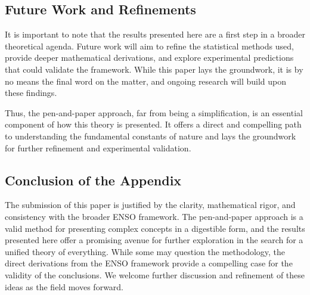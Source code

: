 \documentclass[12pt]{article}
\begin{document}
\subsection{Future Work and Refinements}
It is important to note that the results presented here are a first step in a broader theoretical agenda. Future work will aim to refine the statistical methods used, provide deeper mathematical derivations, and explore experimental predictions that could validate the framework. While this paper lays the groundwork, it is by no means the final word on the matter, and ongoing research will build upon these findings.

Thus, the pen-and-paper approach, far from being a simplification, is an essential component of how this theory is presented. It offers a direct and compelling path to understanding the fundamental constants of nature and lays the groundwork for further refinement and experimental validation.

\subsection{Conclusion of the Appendix}
The submission of this paper is justified by the clarity, mathematical rigor, and consistency with the broader ENSO framework. The pen-and-paper approach is a valid method for presenting complex concepts in a digestible form, and the results presented here offer a promising avenue for further exploration in the search for a unified theory of everything. While some may question the methodology, the direct derivations from the ENSO framework provide a compelling case for the validity of the conclusions. We welcome further discussion and refinement of these ideas as the field moves forward.
\end{document}

